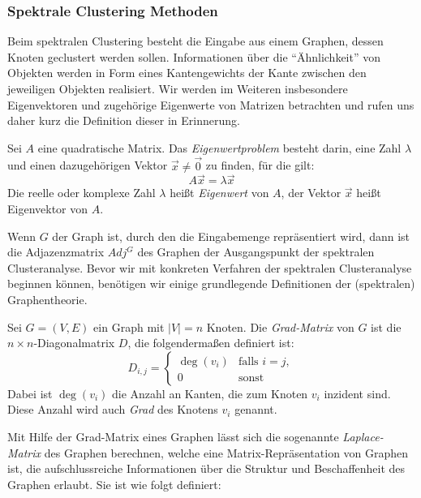 \subsubsection{Spektrale Clustering Methoden}

Beim spektralen Clustering besteht die Eingabe aus einem Graphen, dessen Knoten geclustert werden sollen. Informationen
über die "`Ähnlichkeit"' von Objekten werden in Form eines Kantengewichts der Kante zwischen den jeweiligen Objekten
realisiert. Wir werden im Weiteren insbesondere Eigenvektoren und zugehörige Eigenwerte von Matrizen betrachten und rufen uns
daher kurz die Definition dieser in Erinnerung.

\begin{definition}
\label{def:eigenvector-eigenvalue}
	Sei $A$ eine quadratische Matrix. Das \emph{Eigenwertproblem} besteht darin, eine Zahl $\lambda$ und einen
	dazugehörigen Vektor $\vec{x} \neq \vec{0}$ zu finden, für die gilt:
	\[ A \vec{x} = \lambda \vec{x} \]
	Die reelle oder komplexe Zahl $\lambda$ heißt \emph{Eigenwert} von $A$, der Vektor $\vec{x}$ heißt Eigenvektor von $A$.
\end{definition}

Wenn $G$ der Graph ist, durch den die Eingabemenge repräsentiert wird, dann ist die Adjazenzmatrix $Adj^G$ des
Graphen der Ausgangspunkt der spektralen Clusteranalyse. Bevor wir mit konkreten Verfahren der spektralen Clusteranalyse
beginnen können, benötigen wir einige grundlegende Definitionen der (spektralen) Graphentheorie.

\begin{definition}
\label{def:degree-matrix}
	Sei $G = (V,E)$ ein Graph mit $\left| V \right| = n$ Knoten. Die \emph{Grad-Matrix} von $G$ ist die
	$n \times n$-Diagonalmatrix $D$, die folgendermaßen definiert ist:
	\[ D_{i,j} = 	\begin{cases}
						\deg(v_i) & \textrm{falls } i = j, \\
						0 & \textrm{sonst}
					\end{cases}
	\]
	Dabei ist $\deg(v_i)$ die Anzahl an Kanten, die zum Knoten $v_i$ inzident sind. Diese Anzahl wird auch
	\emph{Grad} des Knotens $v_i$ genannt.
\end{definition}

Mit Hilfe der Grad-Matrix eines Graphen lässt sich die sogenannte \emph{Laplace-Matrix} des Graphen berechnen, welche eine
Matrix-Repräsentation von Graphen ist, die aufschlussreiche Informationen über die Struktur und Beschaffenheit des Graphen
erlaubt. Sie ist wie folgt definiert:

